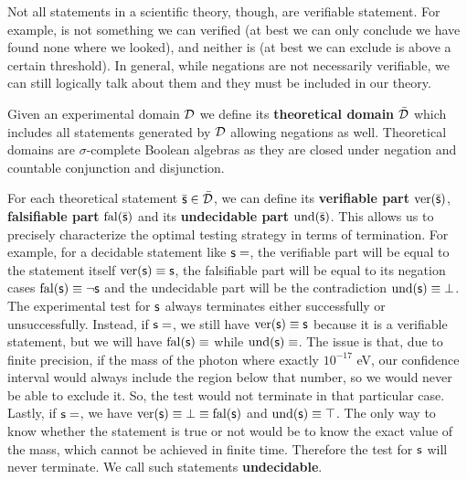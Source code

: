 \documentclass[twocolumn]{article}
\begin{document}
Not all statements in a scientific theory, though, are verifiable statement. For example,  is not something we can verified (at best we can only conclude we have found none where we looked), and neither is  (at best we can exclude is above a certain threshold). In general, while negations are not necessarily verifiable, we can still logically talk about them and they must be included in our theory.

Given an experimental domain $\mathcal{D}$ we define its \textbf{theoretical domain} $\bar{\mathcal{D}}$ which includes all statements generated by $\mathcal{D}$ allowing negations as well. Theoretical domains are $\sigma$-complete Boolean algebras as they are closed under negation and countable conjunction and disjunction.

For each theoretical statement $\bar{\mathsf{s}} \in \bar{\mathcal{D}}$, we can define its \textbf{verifiable part} $\operatorname{ver}(\bar{\mathsf{s}})$, \textbf{falsifiable part} $\operatorname{fal}(\bar{\mathsf{s}})$ and its \textbf{undecidable part} $\operatorname{und}(\bar{\mathsf{s}})$. This allows us to precisely characterize the optimal testing strategy in terms of termination. For example, for a decidable statement like $\mathsf{s}=$, the verifiable part will be equal to the statement itself $\operatorname{ver}(\mathsf{s}) \equiv \mathsf{s}$, the falsifiable part will be equal to its negation cases $\operatorname{fal}(\mathsf{s}) \equiv \neg\mathsf{s}$ and the undecidable part will be the contradiction $\operatorname{und}(\mathsf{s}) \equiv \bot$. The experimental test for $\mathsf{s}$ always terminates either successfully or unsuccessfully. Instead, if $\mathsf{s}=$, we still have $\operatorname{ver}(\mathsf{s}) \equiv \mathsf{s}$ because it is a verifiable statement, but we will have $\operatorname{fal}(\mathsf{s}) \equiv$ while $\operatorname{und}(\mathsf{s}) \equiv$. The issue is that, due to finite precision, if the mass of the photon where exactly $10^{-17}$ eV, our confidence interval would always include the region below that number, so we would never be able to exclude it. So, the test would not terminate in that particular case. Lastly, if $\mathsf{s}=$, we have $\operatorname{ver}(\mathsf{s}) \equiv \bot \equiv \operatorname{fal}(\mathsf{s})$ and $\operatorname{und}(\mathsf{s}) \equiv \top$. The only way to know whether the statement is true or not would be to know the exact value of the mass, which cannot be achieved in finite time. Therefore the test for $\mathsf{s}$ will never terminate. We call such statements \textbf{undecidable}.
\end{document}

